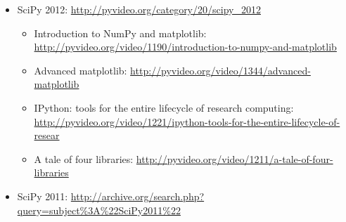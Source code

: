 \begin{itemize}
\begin{itemize}
    \end{itemize}
  \item SciPy 2012: \url{http://pyvideo.org/category/20/scipy\_2012}
    \begin{itemize}
      \item Introduction to NumPy and matplotlib: \url{http://pyvideo.org/video/1190/introduction-to-numpy-and-matplotlib}
      \item Advanced matplotlib: \url{http://pyvideo.org/video/1344/advanced-matplotlib}
      \item IPython: tools for the entire lifecycle of research computing: \url{http://pyvideo.org/video/1221/ipython-tools-for-the-entire-lifecycle-of-resear}
      \item A tale of four libraries: \url{http://pyvideo.org/video/1211/a-tale-of-four-libraries}
    \end{itemize}
  \item SciPy 2011: \url{http://archive.org/search.php?query=subject\%3A\%22SciPy2011\%22}
\end{itemize}
